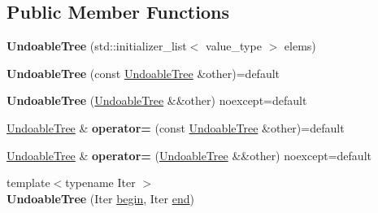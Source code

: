 \subsection*{Public Member Functions}
\begin{DoxyCompactItemize}
\item 
\mbox{\label{classlab_1_1forest_1_1UndoableTree_ac77c3e18c250430b5e13bd015eff0946}} 
{\bfseries Undoable\+Tree} (std\+::initializer\+\_\+list$<$ value\+\_\+type $>$ elems)
\item 
\mbox{\label{classlab_1_1forest_1_1UndoableTree_a2c2edafd4a90b4cc0b12212fb6682287}} 
{\bfseries Undoable\+Tree} (const \hyperlink{classlab_1_1forest_1_1UndoableTree}{Undoable\+Tree} \&other)=default
\item 
\mbox{\label{classlab_1_1forest_1_1UndoableTree_a6827813d5b65bbd4af5a8dd8ca8d6adc}} 
{\bfseries Undoable\+Tree} (\hyperlink{classlab_1_1forest_1_1UndoableTree}{Undoable\+Tree} \&\&other) noexcept=default
\item 
\mbox{\label{classlab_1_1forest_1_1UndoableTree_a88123444da2ca4a1068de8d9bf0f04f6}} 
\hyperlink{classlab_1_1forest_1_1UndoableTree}{Undoable\+Tree} \& {\bfseries operator=} (const \hyperlink{classlab_1_1forest_1_1UndoableTree}{Undoable\+Tree} \&other)=default
\item 
\mbox{\label{classlab_1_1forest_1_1UndoableTree_a38b331baf68b85d65e8bbf85f40f8d95}} 
\hyperlink{classlab_1_1forest_1_1UndoableTree}{Undoable\+Tree} \& {\bfseries operator=} (\hyperlink{classlab_1_1forest_1_1UndoableTree}{Undoable\+Tree} \&\&other) noexcept=default
\item 
\mbox{\label{classlab_1_1forest_1_1UndoableTree_ab0247c252d8c3ad9fa79c5f2d791a1e3}} 
{\footnotesize template$<$typename Iter $>$ }\\{\bfseries Undoable\+Tree} (Iter \hyperlink{classlab_1_1forest_1_1UndoableTree_a70250f012747174b8935cf9fe5fe72ed}{begin}, Iter \hyperlink{classlab_1_1forest_1_1UndoableTree_af404b6bb41ddad0291cf2ab22deee478}{end})
\item 
\mbox{\label{classlab_1_1forest_1_1UndoableTree_aed97dba3340b6aec26acac81d23c8525}} 

\end{DoxyCompactItemize}

